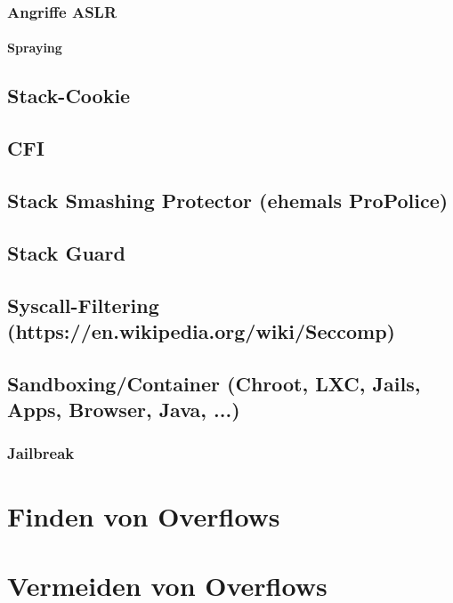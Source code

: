 \documentclass[12pt]{book}
\begin{document}
\subsection{Angriffe ASLR}

\subsubsection{Spraying}

\section{Stack-Cookie}

\section{CFI}

\section{Stack Smashing Protector (ehemals ProPolice)}

\section{Stack Guard}

\section{Syscall-Filtering (https://en.wikipedia.org/wiki/Seccomp)}

\section{Sandboxing/Container (Chroot, LXC, Jails, Apps, Browser, Java, ...)}

\subsection{Jailbreak}

\chapter{Finden von Overflows}

\chapter{Vermeiden von Overflows}
\end{document}
